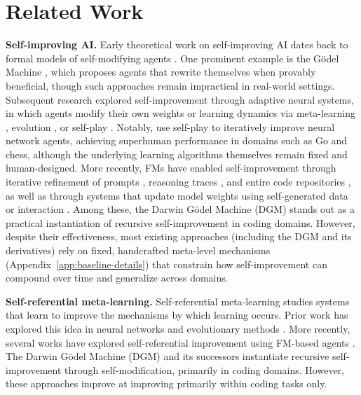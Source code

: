 \section{Related Work}
\label{sec:related-work}

\textbf{Self-improving AI.}
Early theoretical work on self-improving AI dates back to formal models of self-modifying agents \citep{hutter2003gentle}. One prominent example is the G\"{o}del Machine \citep{schmidhuber2003godel}, which proposes agents that rewrite themselves when provably beneficial, though such approaches remain impractical in real-world settings. Subsequent research explored self-improvement through adaptive neural systems, in which agents modify their own weights or learning dynamics via meta-learning \citep{schmidhuber1993neural, miconi2018differentiable, javed2019meta, beaulieu2020learning, miconi2020backpropamine, irie2022modern, chalvidal2022meta, oh2025discovering}, evolution \citep{stanley2002evolving, lange2023discovering, qiu2025evolution, zhao2025automated}, or self-play \citep{silver2016mastering, silver2017mastering, xia2025agent0, xia2026skillrl}. Notably, \citet{silver2017mastering} use self-play to iteratively improve neural network agents, achieving superhuman performance in domains such as Go and chess, although the underlying learning algorithms themselves remain fixed and human-designed. More recently, FMs have enabled self-improvement through iterative refinement of prompts \citep{fernando2023promptbreeder, wang2025evolving, zhang2025agentic, zhang2025recursive, ye2026meta}, reasoning traces \citep{zelikman2022star, yin2025godel, havrilla2024teaching, zhuge2024gptswarm}, and entire code repositories \citep{zhang2025darwin, wang2025huxley, xia2025live}, as well as through systems that update model weights using self-generated data or interaction \citep{wu2024copilot, zweiger2025self, wen2025unsupervised, wei2025toward}. Among these, the Darwin G\"{o}del Machine (DGM) \citep{zhang2025darwin} stands out as a practical instantiation of recursive self-improvement in coding domains. However, despite their effectiveness, most existing approaches (including the DGM and its derivatives) rely on fixed, handcrafted meta-level mechanisms (Appendix~\ref{app:baseline-details}) that constrain how self-improvement can compound over time and generalize across domains.

\textbf{Self-referential meta-learning.}
Self-referential meta-learning studies systems that learn to improve the mechanisms by which learning occurs. Prior work has explored this idea in neural networks \citep{kirsch2022eliminating, jackson2024discovering} and evolutionary methods \citep{lu2023arbitrary}. More recently, several works have explored self-referential improvement using FM-based agents \citep{zelikman2024self, robeyns2025self, yin2025godel, zhang2025darwin}. The Darwin G\"{o}del Machine (DGM) \citep{zhang2025darwin} and its successors \citep{wang2025huxley, xia2025live, weng2026group} instantiate recursive self-improvement through self-modification, primarily in coding domains. However, these approaches improve at improving primarily within coding tasks only.

